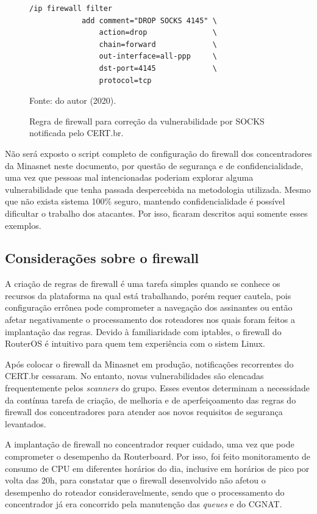     \begin{figure}[!htb]
        \centering
        \caption{Regra de firewall para correção da vulnerabilidade por SOCKS notificada pelo CERT.br.} 
        \label{fig:drop_socks}
        
        \begin{Verbatim}[fontsize=\normalsize]
            /ip firewall filter
            add comment="DROP SOCKS 4145" \
                action=drop               \
                chain=forward             \
                out-interface=all-ppp     \
                dst-port=4145             \
                protocol=tcp
        \end{Verbatim} 

        {\small Fonte: do autor (2020).} 
    \end{figure}
    
    Não será exposto o script completo de configuração do firewall dos concentradores da Minasnet neste documento, por questão de segurança e de confidencialidade, uma vez que pessoas mal intencionadas poderiam explorar alguma vulnerabilidade que tenha passada despercebida na metodologia utilizada. Mesmo que não exista sistema 100\% seguro, mantendo confidencialidade é possível dificultar o trabalho dos atacantes. Por isso, ficaram descritos aqui somente esses exemplos.
    
\subsection{Considerações sobre o firewall}
    
    A criação de regras de firewall é uma tarefa simples quando se conhece os recursos da plataforma na qual está trabalhando, porém requer cautela, pois configuração errônea pode comprometer a navegação dos assinantes ou então afetar negativamente o processamento dos roteadores nos quais foram feitos a implantação das regras. Devido à familiaridade com iptables, o firewall do RouterOS é intuitivo para quem tem experiência com o sistem Linux.
    
    Após colocar o firewall da Minasnet em produção, notificações recorrentes do CERT.br cessaram. No entanto, novas vulnerabilidades são elencadas frequentemente pelos \textit{scanners} do grupo. Esses eventos determinam a necessidade da contínua tarefa de criação, de melhoria e de aperfeiçoamento das regras do firewall dos concentradores para atender aos novos requisitos de segurança levantados.
    
    A implantação de firewall no concentrador requer cuidado, uma vez que pode comprometer o desempenho da Routerboard. Por isso, foi feito monitoramento de consumo de CPU em diferentes horários do dia, inclusive em horários de pico por volta das 20h, para constatar que o firewall desenvolvido não afetou o desempenho do roteador consideravelmente, sendo que o processamento do concentrador já era concorrido pela manutenção das \textit{queues} e do CGNAT.
    
